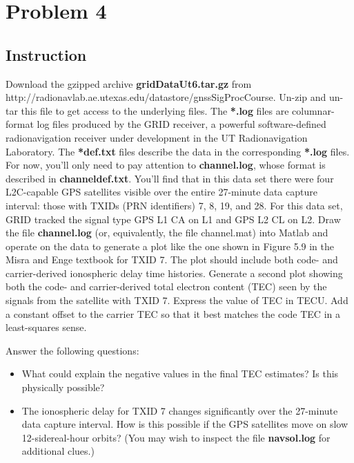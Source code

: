 \section{Problem 4}

\subsection{Instruction}

Download the gzipped archive \textbf{gridDataUt6.tar.gz} from
http://radionavlab.ae.utexas.edu/datastore/gnssSigProcCourse.
Un-zip and un-tar this file to get access to the underlying files. The
\textbf{*.log} files are columnar-format log files produced by the GRID receiver,
a powerful software-defined radionavigation receiver under development in the UT
Radionavigation Laboratory. The \textbf{*def.txt} files describe the data in the
corresponding \textbf{*.log} files. For now, you’ll only need to pay attention to
\textbf{channel.log}, whose format is described in \textbf{channeldef.txt}.
You’ll find that in this data set there were four L2C-capable GPS satellites
visible over the entire 27-minute data capture interval: those with TXIDs
(PRN identifiers) 7, 8, 19, and 28. For this data set, GRID tracked the signal
type GPS L1 CA on L1 and GPS L2 CL on L2. Draw the file \textbf{channel.log}
(or, equivalently, the file channel.mat) into Matlab and operate on the data to
generate a plot like the one shown in Figure 5.9 in the Misra and Enge textbook
for TXID 7. The plot should include both code- and carrier-derived ionospheric
delay time histories. Generate a second plot showing both the code- and
carrier-derived total electron content (TEC) seen by the signals from the
satellite with TXID 7. Express the value of TEC in TECU. Add a constant offset
to the carrier TEC so that it best matches the code TEC in a least-squares sense.

Answer the following questions:

\begin{itemize}
	\item What could explain the negative values in the final TEC estimates?
	      Is this physically possible?

	\item The ionospheric delay for TXID 7 changes significantly over the 27-minute
	      data capture interval. How is this possible if the GPS satellites move on
	      slow 12-sidereal-hour orbits? (You may wish to inspect the file
	      \textbf{navsol.log} for additional clues.)
\end{itemize}


